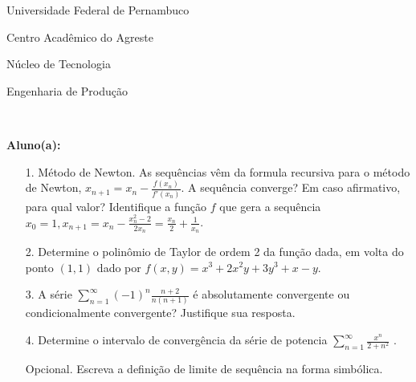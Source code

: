 \documentclass[oneside,a4paper,12pt]{article}
\newcommand{\universidade}{Universidade Federal de Pernambuco}
\newcommand{\centro}{Centro Acadêmico do Agreste}
\newcommand{\departamento}{Núcleo de Tecnologia}
\newcommand{\curso}{Engenharia de Produção}
\begin{document}
	\pagestyle{empty}
	
	\begin{center}
	 	\vspace{0pt}
	 	
		\universidade
		\par
		\centro
		\par
		\departamento
		\par
		\curso
		\par
		\vspace{08pt}
		\\
	\end{center}
	
	
	\begin{flushleft}
		\textbf{Aluno(a):}
	\end{flushleft}
	
\begin{itemize}
\item[1.] Método de Newton. As sequências vêm da formula recursiva para o método de Newton, $x_{n+1}=x_{n}-\frac{f(x_{n})}{f'(x_{n})}$. A sequência converge? Em caso afirmativo, para qual valor? Identifique a função $f$ que gera a sequência $x_{0}=1, x_{n+1}=x_{n}-\frac{x_{n}^{2}-2}{2x_{n}}=\frac{x_{n}}{2}+\frac{1}{x_{n}}$.
\end{itemize}
\begin{itemize}
\item[2.] Determine o polinômio de Taylor de ordem 2 da função dada, em volta do ponto $(1,1)$ dado por  $f(x,y)=x^{3}+2x^{2}y+3y^{3}+x-y$. 
 \end{itemize}
 \begin{itemize}
\item [3.] A série $\sum_{n=1}^{\infty} (-1)^{n}\frac{n+2}{n(n+1)} $ é absolutamente convergente ou condicionalmente convergente? Justifique sua resposta.
\end{itemize}
\begin{itemize}
\item[4.] Determine o intervalo de convergência da série de potencia  $\sum_{n=1}^{\infty}\frac{x^{n}}{2+n^{2}} $ .
\end{itemize}
\begin{itemize}
	\item[Opcional.] Escreva a definição de limite de sequência na forma simbólica.
\end{itemize}
\end{document}
